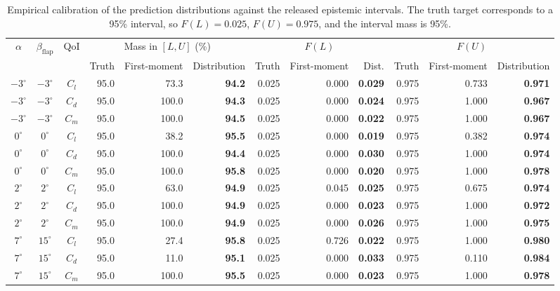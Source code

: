\documentclass[a4paper,12pt]{article}
\begin{document}
\begin{table}[H]
\centering
\caption{Empirical calibration of the prediction distributions against the released epistemic intervals. The truth target corresponds to a 95\% interval, so $F(L)=0.025$, $F(U)=0.975$, and the interval mass is 95\%.}
\label{tab:uq_empirical_calibration}
\scriptsize
\setlength{\tabcolsep}{3pt}
\begin{tabular}{cccrrrrrrrrr}
\toprule
$\alpha$ & $\beta_{\mathrm{flap}}$ & QoI & \multicolumn{3}{c}{Mass in $[L,U]$ (\%)} & \multicolumn{3}{c}{$F(L)$} & \multicolumn{3}{c}{$F(U)$} \\
\cmidrule(lr){4-6}\cmidrule(lr){7-9}\cmidrule(lr){10-12}
 & & & Truth & First-moment & Distribution & Truth & First-moment & Dist. & Truth & First-moment & Distribution \\
\midrule
$-3^\circ$ & $-3^\circ$ & $C_l$ & 95.0 & 73.3 & {\bf 94.2} & 0.025 & 0.000 & {\bf 0.029} & 0.975 & 0.733 & {\bf 0.971} \\
$-3^\circ$ & $-3^\circ$ & $C_d$ & 95.0 & 100.0 & {\bf 94.3} & 0.025 & 0.000 & {\bf 0.024} & 0.975 & 1.000 & {\bf 0.967} \\
$-3^\circ$ & $-3^\circ$ & $C_m$ & 95.0 & 100.0 & {\bf 94.5} & 0.025 & 0.000 & {\bf 0.022} & 0.975 & 1.000 & {\bf 0.967} \\
\addlinespace
$0^\circ$ & $0^\circ$ & $C_l$ & 95.0 & 38.2 & {\bf 95.5} & 0.025 & 0.000 & {\bf 0.019} & 0.975 & 0.382 & {\bf 0.974} \\
$0^\circ$ & $0^\circ$ & $C_d$ & 95.0 & 100.0 & {\bf 94.4} & 0.025 & 0.000 & {\bf 0.030} & 0.975 & 1.000 & {\bf 0.974} \\
$0^\circ$ & $0^\circ$ & $C_m$ & 95.0 & 100.0 & {\bf 95.8} & 0.025 & 0.000 & {\bf 0.020} & 0.975 & 1.000 & {\bf 0.978} \\
\addlinespace
$2^\circ$ & $2^\circ$ & $C_l$ & 95.0 & 63.0 & {\bf 94.9} & 0.025 & 0.045 & {\bf 0.025} & 0.975 & 0.675 & {\bf 0.974} \\
$2^\circ$ & $2^\circ$ & $C_d$ & 95.0 & 100.0 & {\bf 94.9} & 0.025 & 0.000 & {\bf 0.023} & 0.975 & 1.000 & {\bf 0.972} \\
$2^\circ$ & $2^\circ$ & $C_m$ & 95.0 & 100.0 & {\bf 94.9} & 0.025 & 0.000 & {\bf 0.026} & 0.975 & 1.000 & {\bf 0.975} \\
\addlinespace
$7^\circ$ & $15^\circ$ & $C_l$ & 95.0 & 27.4 & {\bf 95.8} & 0.025 & 0.726 & {\bf 0.022} & 0.975 & 1.000 & {\bf 0.980} \\
$7^\circ$ & $15^\circ$ & $C_d$ & 95.0 & 11.0 & {\bf 95.1} & 0.025 & 0.000 & {\bf 0.033} & 0.975 & 0.110 & {\bf 0.984} \\
$7^\circ$ & $15^\circ$ & $C_m$ & 95.0 & 100.0 & {\bf 95.5} & 0.025 & 0.000 & {\bf 0.023} & 0.975 & 1.000 & {\bf 0.978} \\
\bottomrule
\end{tabular}
\end{table}
\end{document}
